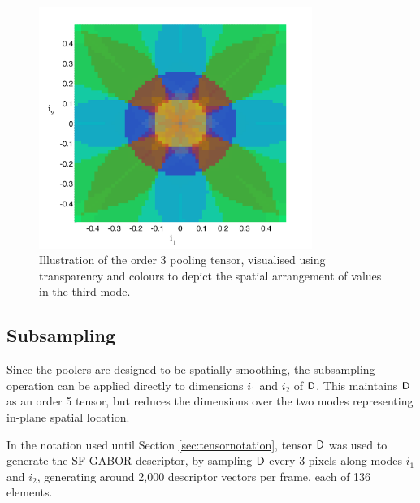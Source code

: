 \begin{figure}[!t]
\centering
\includegraphics[width=3.5in]{gfx/Chapter05/PoolingTensorRender.png}
\caption{Illustration of the order 3 pooling tensor, visualised using transparency and colours to depict the spatial arrangement of values in the third mode. }
\label{fig:PoolingTensor}
\end{figure}



\subsection{Subsampling}

Since the poolers are designed to be spatially smoothing, the subsampling operation can be applied directly to dimensions $i_1$ and $i_2$ of $\mathsf{D}$. This maintains $\mathsf{D}$ as an order 5 tensor, but reduces the dimensions over the two modes representing in-plane spatial location. 

In the notation used until Section \ref{sec:tensornotation}, tensor $\mathsf{D}$ was used to generate the SF-GABOR descriptor, by sampling $\mathsf{D}$ every 3 pixels along modes $i_1$ and $i_2$, generating around 2,000 descriptor vectors per frame, each of 136 elements.



